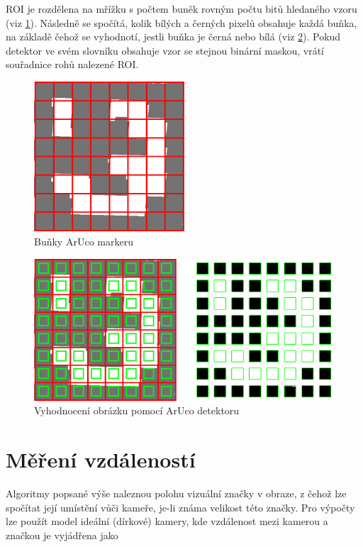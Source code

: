 \documentclass[twoside]{ctuthesis}
\theoremstyle{plain}
\theoremstyle{definition}
\theoremstyle{note}
\begin{document}
ROI je rozdělena na mřížku s počtem buněk rovným počtu bitů hledaného vzoru (viz \ref{cell}). Následně se spočítá, kolik bílých a černých pixelů obsahuje každá buňka, na základě čehož se vyhodnotí, jestli buňka je černá nebo bílá (viz \ref{cellm}). Pokud detektor ve svém slovníku obsahuje vzor se stejnou binární maskou, vrátí souřadnice rohů nalezené ROI.

\begin{figure}
	\caption{Buňky ArUco markeru}
	
	\label{cell}
	\includegraphics[width=0.5\textwidth]{images/2/bitsextraction1.png}
\end{figure}
\begin{figure}
	\caption{Vyhodnocení obrázku pomocí ArUco detektoru}
	
	\label{cellm}
	\includegraphics[width=1\textwidth]{images/2/bitsextraction2.png}
\end{figure}
\section{Měření vzdáleností}

Algoritmy popsané výše naleznou polohu vizuální značky v obraze, z čehož lze spočítat její umístění vůči kameře, je-li známa velikost této značky. Pro výpočty lze použít model ideální (dírkové) kamery, kde vzdálenost mezi kamerou a značkou je vyjádřena jako
\end{document}
